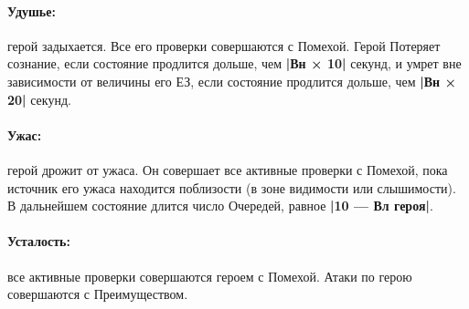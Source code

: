 \paragraph{Удушье:} герой задыхается. Все его проверки совершаются с Помехой. Герой Потеряет сознание, если состояние продлится дольше, чем \textbf{|Вн × 10|} секунд, и умрет вне зависимости от величины его ЕЗ, если состояние продлится дольше, чем \textbf{|Вн × 20|} секунд.
\paragraph{Ужас:} герой дрожит от ужаса. Он совершает все активные проверки с Помехой, пока источник его ужаса находится поблизости (в зоне видимости или слышимости). В дальнейшем состояние длится число Очередей, равное \textbf{|10 — Вл героя|}.
\paragraph{Усталость:} все активные проверки совершаются героем с Помехой. Атаки по герою совершаются с Преимуществом.